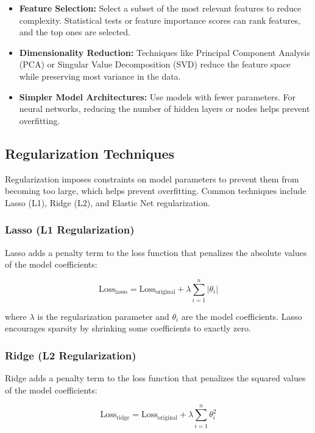 \documentclass[12pt]{book} %
\begin{document}
\begin{itemize}
    \item \textbf{Feature Selection:} Select a subset of the most relevant features to reduce complexity. Statistical tests or feature importance scores can rank features, and the top ones are selected.
    
    \item \textbf{Dimensionality Reduction:} Techniques like Principal Component Analysis (PCA) or Singular Value Decomposition (SVD) reduce the feature space while preserving most variance in the data.
    
    \item \textbf{Simpler Model Architectures:} Use models with fewer parameters. For neural networks, reducing the number of hidden layers or nodes helps prevent overfitting.
\end{itemize}

\subsection{Regularization Techniques}

Regularization imposes constraints on model parameters to prevent them from becoming too large, which helps prevent overfitting. Common techniques include Lasso (L1), Ridge (L2), and Elastic Net regularization.

\subsubsection{Lasso (L1 Regularization)}

Lasso adds a penalty term to the loss function that penalizes the absolute values of the model coefficients:

\[
\text{Loss}_{\text{lasso}} = \text{Loss}_{\text{original}} + \lambda \sum_{i=1}^{n} |\theta_i|
\]

where \( \lambda \) is the regularization parameter and \( \theta_i \) are the model coefficients. Lasso encourages sparsity by shrinking some coefficients to exactly zero.

\subsubsection{Ridge (L2 Regularization)}

Ridge adds a penalty term to the loss function that penalizes the squared values of the model coefficients:

\[
\text{Loss}_{\text{ridge}} = \text{Loss}_{\text{original}} + \lambda \sum_{i=1}^{n} \theta_i^2
\]
\end{document}
